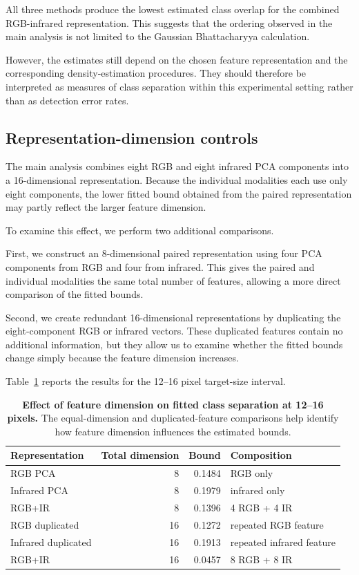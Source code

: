 \documentclass[10pt]{article}
\begin{document}
All three methods produce the lowest estimated class overlap for the combined RGB-infrared representation. This suggests that the ordering observed in the main analysis is not limited to the Gaussian Bhattacharyya calculation.

However, the estimates still depend on the chosen feature representation and the corresponding density-estimation procedures. They should therefore be interpreted as measures of class separation within this experimental setting rather than as detection error rates.

\subsection{Representation-dimension controls}

The main analysis combines eight RGB and eight infrared PCA components into a 16-dimensional representation. Because the individual modalities each use only eight components, the lower fitted bound obtained from the paired representation may partly reflect the larger feature dimension.

To examine this effect, we perform two additional comparisons.

First, we construct an 8-dimensional paired representation using four PCA components from RGB and four from infrared. This gives the paired and individual modalities the same total number of features, allowing a more direct comparison of the fitted bounds.

Second, we create redundant 16-dimensional representations by duplicating the eight-component RGB or infrared vectors. These duplicated features contain no additional information, but they allow us to examine whether the fitted bounds change simply because the feature dimension increases.

Table~\ref{tab:dimcontrol} reports the results for the 12--16 pixel target-size interval.

\begin{table}[h]
\centering
\caption{\textbf{Effect of feature dimension on fitted class separation at 12--16 pixels.}
The equal-dimension and duplicated-feature comparisons help identify how feature dimension influences the estimated bounds.}
\label{tab:dimcontrol}
\small
\begin{tabular}{lrrl}
\toprule
Representation & Total dimension & Bound & Composition \\
\midrule
RGB PCA
& 8 & 0.1484 & RGB only \\

Infrared PCA
& 8 & 0.1979 & infrared only \\

RGB+IR
& 8 & 0.1396 & 4 RGB + 4 IR \\

RGB duplicated
& 16 & 0.1272 & repeated RGB feature \\

Infrared duplicated
& 16 & 0.1913 & repeated infrared feature \\

RGB+IR
& 16 & 0.0457 & 8 RGB + 8 IR \\
\bottomrule
\end{tabular}
\end{table}
\end{document}
